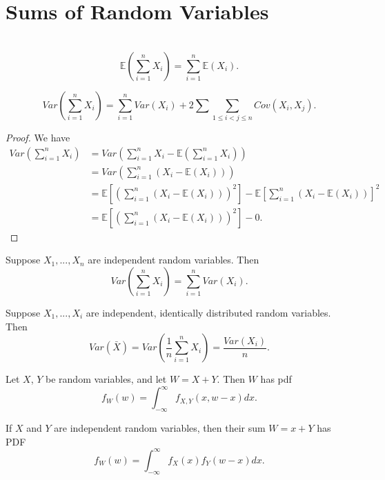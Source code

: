 \section{Sums of Random Variables}

\begin{prop} $ $
  \[ \mathbb{E} \left(\sum_{ i = 1}^{n} X_i \right) = \sum_{ i = 1}^{n} \mathbb{E}(X_i).\]    
\end{prop}

\begin{prop}
\[Var \left( \sum_{ i = 1}^{n} X_i \right) = \sum_{ i = 1}^{n} Var(X_i) + 2 \sum \sum_{1 \leq i < j \leq n} Cov(X_i, X_j).\]
\end{prop}
\begin{proof}
    We have
    \begin{align*}
      Var \left( \sum_{ i = 1}^{n} X_i \right) &= Var \left( \sum_{ i = 1}^{n} X_i  - \mathbb{E}( \sum_{ i = 1}^{n} X_i)\right) \\ 
       &= Var \left( \sum_{ i = 1}^{n} (X_i - \mathbb{E}(X_i))\right) \\
       &= \mathbb{E}\left[ (\sum_{ i = 1}^{n} (X_i - \mathbb{E}(X_i)))^2\right] - \mathbb{E}\left[ \sum_{ i = 1}^{n} (X_i - \mathbb{E}(X_i))\right]^2 \\
       &= \mathbb{E}\left[ (\sum_{ i = 1}^{n} (X_i - \mathbb{E}(X_i)))^2\right] - 0
    .\end{align*}
\end{proof}

\begin{prop}
    Suppose $X_1,...,X_n$ are independent random variables. Then
    \[Var \left( \sum_{ i = 1}^{n} X_i \right) = \sum_{ i = 1}^{n} Var(X_i).\]
\end{prop}

\begin{prop}
    Suppose $X_1,...,X_i$ are independent, identically distributed random variables. Then
    \[Var( \bar{X}) = Var \left( \frac{1}{n} \sum_{ i = 1}^{n} X_i \right) = \frac{Var(X_i)}{n} .\]
\end{prop}
\begin{theorem}
    Let $X$, $Y$ be random variables, and let $W = X + Y$. Then $W$ has pdf
    \[f_W(w) = \int_{-\infty}^\infty f_{X,Y}(x, w - x) dx.\]
\end{theorem}

\begin{prop}
    If $X$ and $Y$ are independent random variables, then their sum $W = x + Y$ has PDF
    \[f_W(w) = \int_{-\infty}^\infty f_{X}(x) f_Y(w-x) dx.\]
\end{prop}

